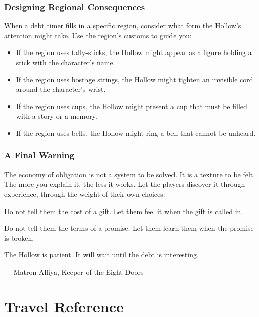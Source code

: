 \documentclass[12pt,oneside]{book}
\begin{document}
\subsection{Designing Regional Consequences}

When a debt timer fills in a specific region, consider what form the Hollow's attention might take. Use the region's customs to guide you:

\begin{itemize}
\item If the region uses tally-sticks, the Hollow might appear as a figure holding a stick with the character's name.
\item If the region uses hostage strings, the Hollow might tighten an invisible cord around the character's wrist.
\item If the region uses cups, the Hollow might present a cup that must be filled with a story or a memory.
\item If the region uses bells, the Hollow might ring a bell that cannot be unheard.
\end{itemize}

\subsection{A Final Warning}

The economy of obligation is not a system to be solved. It is a texture to be felt. The more you explain it, the less it works. Let the players discover it through experience, through the weight of their own choices.

Do not tell them the cost of a gift. Let them feel it when the gift is called in.

Do not tell them the terms of a promise. Let them learn them when the promise is broken.

The Hollow is patient. It will wait until the debt is interesting.

\vspace{1em}
\hfill --- Matron Alfiya, Keeper of the Eight Doors


\newpage
\chapter{Travel Reference}
\label{chap:travel-reference}
\end{document}

